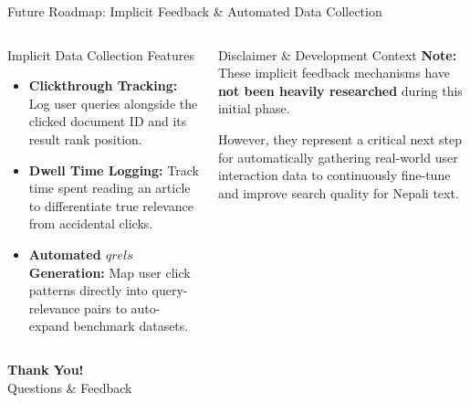 \documentclass[aspectratio=169]{beamer}
\begin{document}
\begin{frame}{Future Roadmap: Implicit Feedback \& Automated Data Collection}
  \begin{columns}
    \begin{block}{Implicit Data Collection Features}
      \begin{itemize}
        \item \textbf{Clickthrough Tracking:} Log user queries alongside the clicked document ID and its result rank position.
        \item \textbf{Dwell Time Logging:} Track time spent reading an article to differentiate true relevance from accidental clicks.
        \item \textbf{Automated $qrels$ Generation:} Map user click patterns directly into query-relevance pairs to auto-expand benchmark datasets.
      \end{itemize}
    \end{block}

    \begin{alertblock}{Disclaimer \& Development Context}
      \small
      \textbf{Note:} These implicit feedback mechanisms have \textbf{not been heavily researched} during this initial phase. 
      \vspace{0.2cm}
      
      However, they represent a critical next step for automatically gathering real-world user interaction data to continuously fine-tune and improve search quality for Nepali text.
    \end{alertblock}
  \end{columns}
\end{frame}

\begin{frame}
  \centering
  \Huge \textbf{Thank You!} \\
  \vspace{0.5cm}
  \Large Questions \& Feedback
\end{frame}
\end{document}
